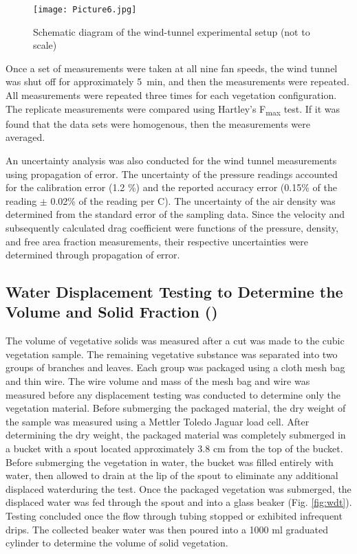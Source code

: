 \documentclass[12pt]{article}
\begin{document}
\begin{figure} [!ht]
	\centering 	\texttt{[image: Picture6.jpg]}
	\caption{Schematic diagram of the wind-tunnel experimental setup (not to scale)}
	\label{fig:Windtun}
\end{figure}

Once a set of measurements were taken at all nine fan speeds, the wind tunnel was shut off for approximately 5~min, and then the measurements were repeated. All measurements were repeated three times for each vegetation configuration. The replicate measurements were compared using Hartley's F\textsubscript{max} test. If it was found that the data sets were homogenous, then the measurements were averaged.

An uncertainty analysis was also conducted for the wind tunnel measurements using propagation of error. The uncertainty of the pressure readings accounted for the calibration error (1.2 \%) and the reported accuracy error (0.15\% of the reading $\pm$ 0.02\% of the reading per \textdegree C). The uncertainty of the air density was determined from the standard error of the sampling data. Since the velocity and subsequently calculated drag coefficient were functions of the pressure, density, and free area fraction measurements, their respective uncertainties were determined through propagation of error.


\subsection{Water Displacement Testing to Determine the Volume and Solid Fraction (\textbeta)}
\label{ssec:headingscap}

The volume of vegetative solids was measured after a cut was made to the cubic vegetation sample. The remaining vegetative substance was separated into two groups of branches and leaves. Each group was packaged using a cloth mesh bag and thin wire. The wire volume and mass of the mesh bag and wire was measured before any displacement testing was conducted to determine only the vegetation material. Before submerging the packaged material, the dry weight of the sample was measured using a Mettler Toledo Jaguar load cell. After determining the dry weight, the packaged material was completely submerged in a bucket with a spout located approximately 3.8 \si{cm} from the top of the bucket. Before submerging the vegetation in water, the bucket was filled entirely with water, then allowed to drain at the lip of the spout to eliminate any additional displaced waterduring the test. Once the packaged vegetation was submerged, the displaced water was fed through the spout and into a glass beaker (Fig. \ref{fig:wdt}). Testing concluded once the flow through tubing stopped or exhibited infrequent drips. The collected beaker water was then poured into a 1000 ml graduated cylinder to determine the volume of solid vegetation.\\
\end{document}
